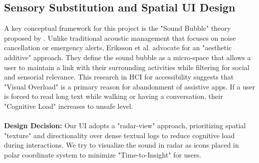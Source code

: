 \subsection{Sensory Substitution and Spatial UI Design}
\label{subsec:hci}
A key conceptual framework for this project is the "Sound Bubble" theory proposed by \cite{Eriksson2017}. 
Unlike traditional acoustic management that focuses on noise cancellation or emergency alerts, Eriksson et al. advocate for an "aesthetic additive" approach. 
They define the sound bubble as a micro-space that allows a user to maintain a link with their surrounding activities while filtering for social and sensorial relevance.
This research in HCI for accessibility suggests that "Visual Overload" is a primary reason for abandonment of assistive apps.
If a user is forced to read long text while walking or having a conversation, their "Cognitive Load" increases to unsafe level.
\\
\\
\textbf{Design Decision:} Our UI adopts a "radar-view" approach, prioritizing spatial "texture" and directionality over dense textual logs to reduce cognitive load during interactions.
We try to visualize the sound in radar as icons placed in polar coordinate system to minimize "Time-to-Insight" for users.